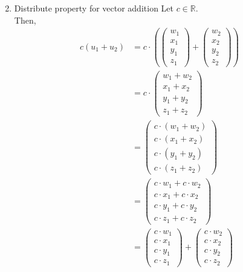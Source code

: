 \documentclass[12pt,letterpaper,fleqn]{article}
\theoremstyle{definition}
\begin{document}
\begin{enumerate}
\begin{equation*}
\end{equation*}
\newpage
\item Distribute property for vector addition
Let $c \in \mathbb{R}$.\\
Then,
\begin{equation*}
\begin{split}
c (u_1 + u_2) &= c \cdot \left(\begin{pmatrix}
w_1\\
x_1\\
y_1\\
z_1
\end{pmatrix} + 
\begin{pmatrix}
w_2\\
x_2\\
y_2\\
z_2
\end{pmatrix}\right)\\
&= c \cdot \begin{pmatrix}
w_1 + w_2\\
x_1 + x_2\\
y_1 + y_2\\
z_1 + z_2
\end{pmatrix} \\
&= \begin{pmatrix}
c \cdot (w_1 + w_2)\\
c \cdot (x_1 + x_2)\\
c \cdot (y_1 + y_2)\\
c \cdot (z_1 + z_2)
\end{pmatrix}\\
&= \begin{pmatrix}
c \cdot w_1 + c \cdot w_2\\
c \cdot x_1 + c \cdot x_2\\
c \cdot y_1 + c \cdot y_2\\
c \cdot z_1 + c \cdot z_2
\end{pmatrix}\\
&= \begin{pmatrix}
c \cdot w_1\\
c \cdot x_1\\
c \cdot y_1\\
c \cdot z_1
\end{pmatrix} + \begin{pmatrix}
c \cdot w_2\\
c \cdot x_2\\
c \cdot y_2\\
c \cdot z_2
\end{pmatrix}\\

\end{split}
\end{equation*}
\end{enumerate}
\end{document}
